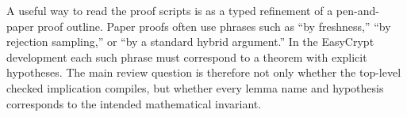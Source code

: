 A useful way to read the proof scripts is as a typed refinement of a
pen-and-paper proof outline.  Paper proofs often use phrases such as ``by
freshness,'' ``by rejection sampling,'' or ``by a standard hybrid argument.''
In the EasyCrypt development each such phrase must correspond to a theorem with
explicit hypotheses.  The main review question is therefore not only whether the
top-level checked implication compiles, but whether every lemma name and
hypothesis corresponds to the intended mathematical invariant.
